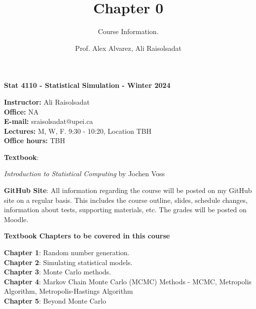 \documentclass[8pt]{beamer}
\title{Chapter 0}
\subtitle{Course Information.}
\author{Prof. Alex Alvarez, Ali Raisolsadat}
\institute{School of Mathematical and Computational Sciences \\ University of Prince Edward Island}
\date{}
\begin{document}
\maketitle

\begin{frame}
\begin{center}
\textbf{Stat 4110 - Statistical Simulation - Winter 2024}\\
\end{center}

\vspace{3mm}

\textbf{Instructor:} Ali Raisolsadat \\
\textbf{Office:} NA \\
\textbf{E-mail:} sraisolsadat@upei.ca \\
\textbf{Lectures:} M, W, F. 9:30 - 10:20, Location TBH \\

\textbf{Office hours:} TBH
\end{frame}

\begin{frame}
\textbf{Textbook}:

\vspace{2mm}

{\it Introduction to Statistical Computing}  by Jochen Voss

\vspace{3mm}

\textbf{GitHub Site}:
All information regarding the course will be posted on my GitHub site on a regular basis. This includes the course outline, slides, schedule changes, information about tests, supporting materials, etc. The grades will be posted on Moodle.
\end{frame}

\begin{frame}
\textbf{Textbook Chapters to be covered in this course}

\vspace{2mm}

\textbf{Chapter 1}: Random number generation.\\
\textbf{Chapter 2}: Simulating statistical models.\\
\textbf{Chapter 3}: Monte Carlo methods.\\
\textbf{Chapter 4}: Markov Chain Monte Carlo (MCMC) Methods - MCMC, Metropolis Algorithm, Metropolis-Hastings Algorithm\\
\textbf{Chapter 5}: Beyond Monte Carlo\\
\end{frame}
\end{document}
